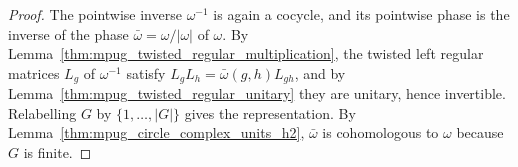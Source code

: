 \begin{proof}\leanok
    The pointwise inverse $\omega^{-1}$ is again a cocycle, and its pointwise
    phase is the inverse of the phase $\bar\omega=\omega/|\omega|$ of
    $\omega$. By Lemma~\ref{thm:mpug_twisted_regular_multiplication}, the
    twisted left regular matrices $L_g$ of $\omega^{-1}$ satisfy
    $L_gL_h=\bar\omega(g,h)L_{gh}$, and by
    Lemma~\ref{thm:mpug_twisted_regular_unitary} they are unitary, hence
    invertible. Relabelling $G$ by $\{1,\dots,|G|\}$ gives the representation.
    By Lemma~\ref{thm:mpug_circle_complex_units_h2}, $\bar\omega$ is
    cohomologous to $\omega$ because $G$ is finite.
\end{proof}
